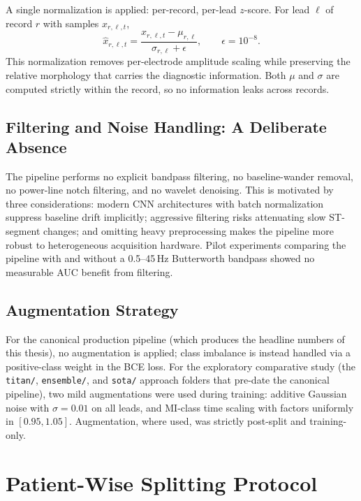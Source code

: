 A single normalization is applied: per-record, per-lead $z$-score. For lead $\ell$ of record $r$ with samples $x_{r,\ell,t}$,
\begin{equation}
\hat{x}_{r,\ell,t} = \frac{x_{r,\ell,t} - \mu_{r,\ell}}{\sigma_{r,\ell} + \epsilon},
\qquad \epsilon = 10^{-8}.
\end{equation}
This normalization removes per-electrode amplitude scaling while preserving the relative morphology that carries the diagnostic information. Both $\mu$ and $\sigma$ are computed strictly within the record, so no information leaks across records.

\subsection{Filtering and Noise Handling: A Deliberate Absence}

The pipeline performs no explicit bandpass filtering, no baseline-wander removal, no power-line notch filtering, and no wavelet denoising. This is motivated by three considerations: modern CNN architectures with batch normalization~\cite{ioffe2015batch} suppress baseline drift implicitly; aggressive filtering risks attenuating slow ST-segment changes; and omitting heavy preprocessing makes the pipeline more robust to heterogeneous acquisition hardware. Pilot experiments comparing the pipeline with and without a 0.5--45\,Hz Butterworth bandpass showed no measurable AUC benefit from filtering.

\subsection{Augmentation Strategy}

For the canonical production pipeline (which produces the headline numbers of this thesis), no augmentation is applied; class imbalance is instead handled via a positive-class weight in the BCE loss. For the exploratory comparative study (the \texttt{titan/}, \texttt{ensemble/}, and \texttt{sota/} approach folders that pre-date the canonical pipeline), two mild augmentations were used during training: additive Gaussian noise with $\sigma = 0.01$ on all leads, and MI-class time scaling with factors uniformly in $[0.95, 1.05]$. Augmentation, where used, was strictly post-split and training-only.

\section{Patient-Wise Splitting Protocol}

